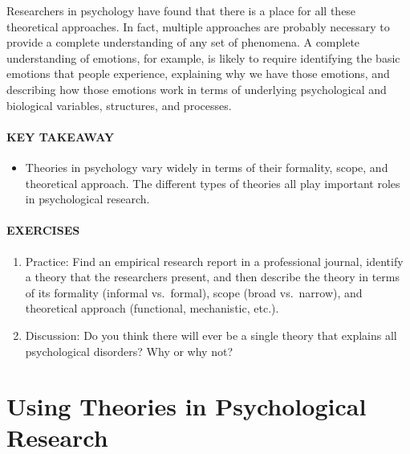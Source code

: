 \documentclass[
]{krantz}
\providecommand{\tightlist}{%
  \setlength{\itemsep}{0pt}\setlength{\parskip}{0pt}}
\begin{document}
Researchers in psychology have found that there is a place for all these theoretical approaches. In fact, multiple approaches are probably necessary to provide a complete understanding of any set of phenomena. A complete understanding of emotions, for example, is likely to require identifying the basic emotions that people experience, explaining why we have those emotions, and describing how those emotions work in terms of underlying psychological and biological variables, structures, and processes.

\hypertarget{key-takeaway}{%
\paragraph*{KEY TAKEAWAY}\label{key-takeaway}}

\begin{itemize}
\tightlist
\item
  Theories in psychology vary widely in terms of their formality, scope, and theoretical approach. The different types of theories all play important roles in psychological research.
\end{itemize}

\hypertarget{exercises-6}{%
\paragraph*{EXERCISES}\label{exercises-6}}

\begin{enumerate}
\def\labelenumi{\arabic{enumi}.}
\tightlist
\item
  Practice: Find an empirical research report in a professional journal, identify a theory that the researchers present, and then describe the theory in terms of its formality (informal vs.~formal), scope (broad vs.~narrow), and theoretical approach (functional, mechanistic, etc.).
\item
  Discussion: Do you think there will ever be a single theory that explains all psychological disorders? Why or why not?
\end{enumerate}

\hypertarget{using-theories-in-psychological-research}{%
\section{Using Theories in Psychological Research}\label{using-theories-in-psychological-research}}
\end{document}
